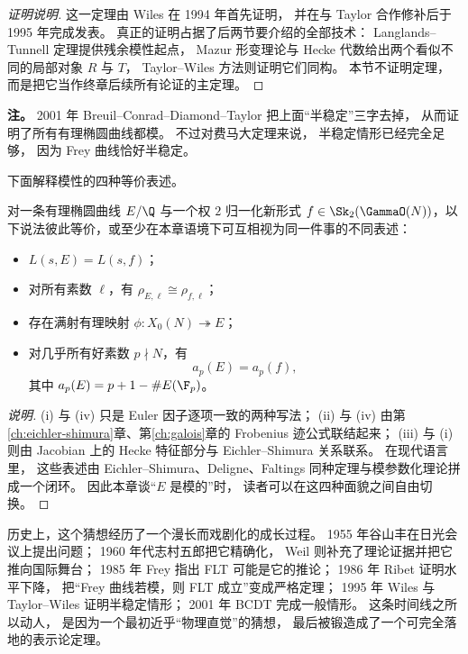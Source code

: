 \begin{proof}[证明说明]
这一定理由 Wiles 在 1994 年首先证明，
并在与 Taylor 合作修补后于 1995 年完成发表。
真正的证明占据了后两节要介绍的全部技术：
Langlands--Tunnell 定理提供残余模性起点，
Mazur 形变理论与 Hecke 代数给出两个看似不同的局部对象 $R$ 与 $T$，
Taylor--Wiles 方法则证明它们同构。
本节不证明定理，
而是把它当作终章后续所有论证的主定理。
\end{proof}

\textbf{注。}
2001 年 Breuil--Conrad--Diamond--Taylor 把上面“半稳定”三字去掉，
从而证明了所有有理椭圆曲线都模。
不过对费马大定理来说，
半稳定情形已经完全足够，
因为 Frey 曲线恰好半稳定。

下面解释模性的四种等价表述。

\begin{proposition}[模性的四种面貌]
\label{prop:ch10-modularity-equivalent}
对一条有理椭圆曲线 $E/\Q$ 与一个权 $2$ 归一化新形式 $f\in \Sk_2(\GammaO(N))$，以下说法彼此等价，或至少在本章语境下可互相视为同一件事的不同表述：
\begin{itemize}
  \item[(i)] $L(s,E)=L(s,f)$；
  \item[(ii)] 对所有素数 $\ell$，有 $\rho_{E,\ell}\cong \rho_{f,\ell}$；
  \item[(iii)] 存在满射有理映射 $\phi\colon X_0(N)\twoheadrightarrow E$；
  \item[(iv)] 对几乎所有好素数 $p\nmid N$，有
  \[
    a_p(E)=a_p(f),
  \]
  其中 $a_p(E)=p+1-\#E(\F_p)$。
\end{itemize}
\end{proposition}

\begin{proof}[说明]
(i) 与 (iv) 只是 Euler 因子逐项一致的两种写法；
(ii) 与 (iv) 由第\ref{ch:eichler-shimura}章、第\ref{ch:galois}章的 Frobenius 迹公式联结起来；
(iii) 与 (i) 则由 Jacobian 上的 Hecke 特征部分与 Eichler--Shimura 关系联系。
在现代语言里，
这些表述由 Eichler--Shimura、Deligne、Faltings 同种定理与模参数化理论拼成一个闭环。
因此本章谈“$E$ 是模的”时，
读者可以在这四种面貌之间自由切换。
\end{proof}

历史上，这个猜想经历了一个漫长而戏剧化的成长过程。
1955 年谷山丰在日光会议上提出问题；
1960 年代志村五郎把它精确化，
Weil 则补充了理论证据并把它推向国际舞台；
1985 年 Frey 指出 FLT 可能是它的推论；
1986 年 Ribet 证明水平下降，
把“Frey 曲线若模，则 FLT 成立”变成严格定理；
1995 年 Wiles 与 Taylor--Wiles 证明半稳定情形；
2001 年 BCDT 完成一般情形。
这条时间线之所以动人，
是因为一个最初近乎“物理直觉”的猜想，
最后被锻造成了一个可完全落地的表示论定理。

